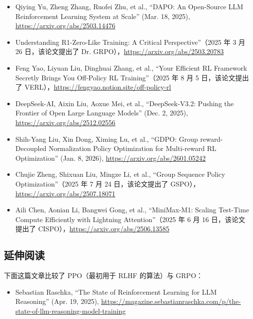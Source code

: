 \begin{itemize}
\item Qiying Yu, Zheng Zhang, Ruofei Zhu, et al., “DAPO: An Open-Source LLM Reinforcement Learning System at Scale” (Mar. 18, 2025), \href{https://arxiv.org/abs/2503.14476}{https://arxiv.org/abs/2503.14476}
\item Understanding R1-Zero-Like Training: A Critical Perspective”（2025 年 3 月 26 日，该论文提出了 Dr. GRPO），\href{https://arxiv.org/abs/2503.20783}{https://arxiv.org/abs/2503.20783}
\item Feng Yao, Liyuan Liu, Dinghuai Zhang, et al., “Your Efficient RL Framework Secretly Brings You Off-Policy RL Training”（2025 年 8 月 5 日，该论文提出了 VERL），\href{https://fengyao.notion.site/off-policy-rl}{https://fengyao.notion.site/off-policy-rl}
\item DeepSeek-AI, Aixin Liu, Aoxue Mei, et al., “DeepSeek-V3.2: Pushing the Frontier of Open Large Language Models” (Dec. 2, 2025), \href{https://arxiv.org/abs/2512.02556}{https://arxiv.org/abs/2512.02556}
\item Shih-Yang Liu, Xin Dong, Ximing Lu, et al., “GDPO: Group reward-Decoupled Normalization Policy Optimization for Multi-reward RL Optimization” (Jan. 8, 2026), \href{https://arxiv.org/abs/2601.05242}{https://arxiv.org/abs/2601.05242}
\item Chujie Zheng, Shixuan Liu, Mingze Li, et al., “Group Sequence Policy Optimization”（2025 年 7 月 24 日，该论文提出了 GSPO），\href{https://arxiv.org/abs/2507.18071}{https://arxiv.org/abs/2507.18071}
\item Aili Chen, Aonian Li, Bangwei Gong, et al., “MiniMax-M1: Scaling Test-Time Compute Efficiently with Lightning Attention”（2025 年 6 月 16 日，该论文提出了 CISPO），\href{https://arxiv.org/abs/2506.13585}{https://arxiv.org/abs/2506.13585}
\end{itemize}

\subsection{延伸阅读}

下面这篇文章比较了 PPO（最初用于 RLHF 的算法）与 GRPO：

\begin{itemize}
\item Sebastian Raschka, “The State of Reinforcement Learning for LLM Reasoning” (Apr. 19, 2025), \href{https://magazine.sebastianraschka.com/p/the-state-of-llm-reasoning-model-training}{https://magazine.sebastianraschka.com/p/the-state-of-llm-reasoning-model-training}
\end{itemize}

